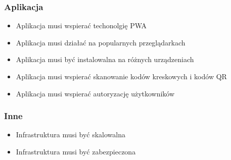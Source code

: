 \documentclass[../main.tex]{subfiles}
\begin{document}
        \subsubsection*{Aplikacja}
            \begin{itemize}
                \item Aplikacja musi wspierać techonolgię PWA
                \item Aplikacja musi działać na popularnych przeglądarkach
                \item Aplikacja musi być instalowalna na różnych urządzeniach
                \item Aplikacja musi wspierać skanowanie kodów kreskowych i kodów QR
                \item Aplikacja musi wspierać autoryzację użytkowników
            \end{itemize}
        \subsubsection*{Inne}
            \begin{itemize}
                \item Infrastruktura musi być skalowalna
                \item Infrastruktura musi być zabezpieczona
            \end{itemize}
\end{document}

